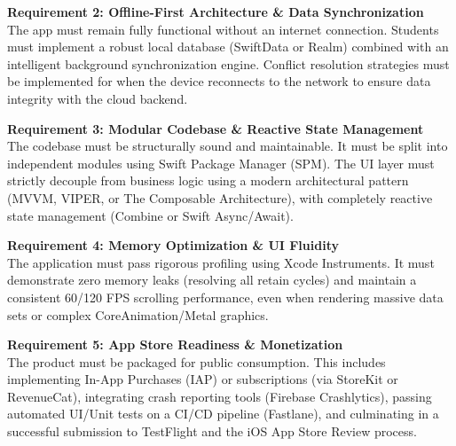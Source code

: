 \vspace{0.3cm}

\noindent\textbf{Requirement 2: Offline-First Architecture \& Data Synchronization} \\
The app must remain fully functional without an internet connection. Students must implement a robust local database (SwiftData or Realm) combined with an intelligent background synchronization engine. Conflict resolution strategies must be implemented for when the device reconnects to the network to ensure data integrity with the cloud backend.

\vspace{0.3cm}

\noindent\textbf{Requirement 3: Modular Codebase \& Reactive State Management} \\
The codebase must be structurally sound and maintainable. It must be split into independent modules using Swift Package Manager (SPM). The UI layer must strictly decouple from business logic using a modern architectural pattern (MVVM, VIPER, or The Composable Architecture), with completely reactive state management (Combine or Swift Async/Await).

\vspace{0.3cm}

\noindent\textbf{Requirement 4: Memory Optimization \& UI Fluidity} \\
The application must pass rigorous profiling using Xcode Instruments. It must demonstrate zero memory leaks (resolving all retain cycles) and maintain a consistent 60/120 FPS scrolling performance, even when rendering massive data sets or complex CoreAnimation/Metal graphics.

\vspace{0.3cm}

\noindent\textbf{Requirement 5: App Store Readiness \& Monetization} \\
The product must be packaged for public consumption. This includes implementing In-App Purchases (IAP) or subscriptions (via StoreKit or RevenueCat), integrating crash reporting tools (Firebase Crashlytics), passing automated UI/Unit tests on a CI/CD pipeline (Fastlane), and culminating in a successful submission to TestFlight and the iOS App Store Review process.

\newpage
{}